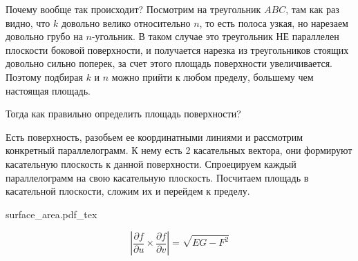 \documentclass[main]{subfiles}
\begin{document}
\begin{example}
    Почему вообще так происходит?
    Посмотрим на треугольник $ABC$, там как раз видно, что $k$ довольно велико относительно $n$,
    то есть полоса узкая, но нарезаем довольно грубо на $n$-угольник.
    В таком случае это треугольник НЕ параллелен плоскости боковой поверхности,
    и получается нарезка из треугольников стоящих довольно сильно поперек, за счет этого площадь поверхности увеличивается.
    Поэтому подбирая $k$ и $n$ можно прийти к любом пределу, большему чем настоящая площадь.
\end{example}

Тогда как правильно определить площадь поверхности?

\begin{definition}
    Есть поверхность, разобьем ее координатными линиями и рассмотрим конкретный параллелограмм.
    К нему есть 2 касательных вектора, они формируют касательную плоскость к данной поверхности.
    Спроецируем каждый параллелограмм на свою касательную плоскость.
    Посчитаем площадь в касательной плоскости, сложим их и перейдем к пределу.
    \begin{center}
        {surface_area.pdf_tex}
    \end{center}
\end{definition}
\begin{theorem}
    \[\left| \frac{\partial f}{\partial u} \times \frac{\partial f}{\partial v}\right| = \sqrt{EG - F^2}\]
\end{theorem}
\end{document}

